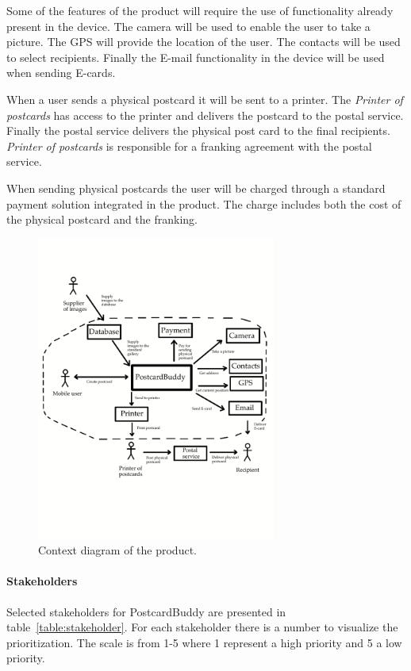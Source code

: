 \documentclass[10pt,a4paper]{article}
\begin{document}
Some of the features of the product will require the use of functionality already present in the device. The camera will be used to enable the user to take a picture. The GPS will provide the location of the user. The contacts will be used to select recipients. Finally the E-mail functionality in the device will be used when sending E-cards.
 
When a user sends a physical postcard it will be sent to a printer. The  \textit{Printer of postcards} has access to the printer and delivers the postcard to the postal service.  Finally the postal service delivers the physical post card to the final recipients. \textit{Printer of postcards} is responsible for a franking agreement with the postal service.

When sending physical postcards the user will be charged through a standard payment solution integrated in the product. The charge includes both the cost of the physical postcard and the franking. 

\begin{figure}[h!]
\centering
\includegraphics[width=0.7\textwidth]{ContextDiagram5.pdf}
\caption{Context diagram of the product.}
\label{fig:context}
\end{figure}
\FloatBarrier

\paragraph{Stakeholders}
Selected stakeholders for PostcardBuddy are presented in table~\ref{table:stakeholder}. For each stakeholder there is a number to visualize the prioritization. The scale is from 1-5 where 1 represent a high priority and 5 a low priority.
\end{document}
